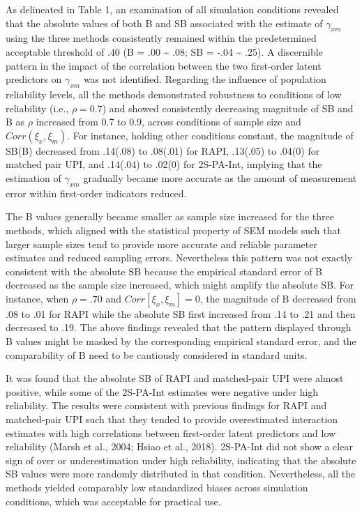\documentclass[
  man]{apa6}
\begin{document}
As delineated in Table 1, an examination of all simulation conditions revealed that the absolute values of both B and SB associated with the estimate of \(\gamma_{xm}\) using the three methods consistently remained within the predetermined acceptable threshold of .40 (B = .00 \textasciitilde{} .08; SB = -.04 \textasciitilde{} .25). A discernible pattern in the impact of the correlation between the two first-order latent predictors on \(\gamma_{xm}\) was not identified. Regarding the influence of population reliability levels, all the methods demonstrated robustness to conditions of low reliability (i.e., \(\rho = 0.7\)) and showed consistently decreasing magnitude of SB and B as \(\rho\) increased from 0.7 to 0.9, across conditions of sample size and \(Corr(\xi_{x}, \xi_{m})\). For instance, holding other conditions constant, the magnitude of SB(B) decreased from .14(.08) to .08(.01) for RAPI, .13(.05) to .04(0) for matched pair UPI, and .14(.04) to .02(0) for 2S-PA-Int, implying that the estimation of \(\gamma_{xm}\) gradually became more accurate as the amount of measurement error within first-order indicators reduced.

The B values generally became smaller as sample size increased for the three methods, which aligned with the statistical property of SEM models such that larger sample sizes tend to provide more accurate and reliable parameter estimates and reduced sampling errors. Nevertheless this pattern was not exactly consistent with the absolute SB because the empirical standard error of B decreased as the sample size increased, which might amplify the absolute SB. For instance, when \(\rho = .70\) and \(Corr[\xi_{x}, \xi_{m}] = 0\), the magnitude of B decreased from .08 to .01 for RAPI while the absolute SB first increased from .14 to .21 and then decreased to .19. The above findings revealed that the pattern displayed through B values might be masked by the corresponding empirical standard error, and the comparability of B need to be cautiously considered in standard units.

It was found that the absolute SB of RAPI and matched-pair UPI were almost positive, while some of the 2S-PA-Int estimates were negative under high reliability. The results were consistent with previous findings for RAPI and matched-pair UPI such that they tended to provide overestimated interaction estimates with high correlations between first-order latent predictors and low reliability (Marsh et al., 2004; Hsiao et al., 2018). 2S-PA-Int did not show a clear sign of over or underestimation under high reliability, indicating that the absolute SB values were more randomly distributed in that condition. Nevertheless, all the methods yielded comparably low standardized biases across simulation conditions, which was acceptable for practical use.
\end{document}
